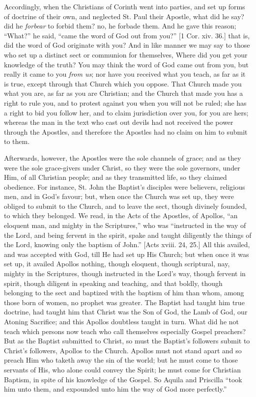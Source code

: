 Accordingly, when the Christians of Corinth went into parties, and
set up forms of doctrine of their own, and neglected St. Paul their
Apostle, what did he say? did he \emph{forbear} to forbid them? no, he
forbade them. And he gave this reason; ``What?'' he said,
``came the word of God out from you?'' [1 Cor. xiv. 36.] that
is, did the word of God originate with you? And in like manner we may
say to those who set up a distinct sect or communion for themselves,
Where did you get your knowledge of the truth? You may think the word
of God came out from you, but really it came to you \emph{from us};
nor have you received what you teach, as far as it is true, except
through that Church which you oppose. That Church made you what you
are, as far as you are Christian; and the Church that made you has a
right to rule you, and to protest against you when you will not be
ruled; she has a right to bid you follow her, and to claim
jurisdiction over you, for you are hers; whereas the man in the text
who cast out devils had not received the power through the Apostles,
and therefore the Apostles had no claim on him to submit to them.

Afterwards, however, the Apostles were the sole channels of grace;
and as they were the sole grace-givers under Christ, so they were the
sole governors, under Him, of all Christian people; and as they
transmitted life, so they claimed obedience. For instance, St. John
the Baptist's disciples were believers, religious men, and in God's
favour; but, when once the Church was set up, they were obliged to
submit to the Church, and to leave the sect, though divinely founded,
to which they belonged. We read, in the Acts of the Apostles, of
Apollos, ``an eloquent man, and mighty in the Scriptures,''
who was ``instructed in the way of the Lord, and being fervent in
the spirit, spake and taught diligently the things of the Lord,
knowing only the baptism of John.'' [Acts xviii. 24, 25.] All this
availed, and was accepted with God, till He had set up His Church; but
when once it was set up, it availed Apollos nothing, though eloquent,
though scriptural, nay, mighty in the Scriptures, though instructed in
the Lord's way, though fervent in spirit, though diligent in speaking
and teaching, and that boldly, though belonging to the sect and
baptized with the baptism of him than whom, among those born of women,
no prophet was greater. The Baptist had taught him true doctrine, had
taught him that Christ was the Son of God, the Lamb of God, our
Atoning Sacrifice; and this Apollos doubtless taught in turn. What did
he not teach which persons now teach who call themselves especially
Gospel preachers? But as the Baptist submitted to Christ, so must the
Baptist's followers submit to Christ's followers, Apollos to the
Church. Apollos must not stand apart and so preach Him who taketh away
the sin of the world; but he must come to those servants of His, who
alone could convey the Spirit; he must come for Christian Baptism, in
spite of his knowledge of the Gospel. So Aquila and Priscilla
``took him unto them, and expounded unto him the way of God more
perfectly.''

